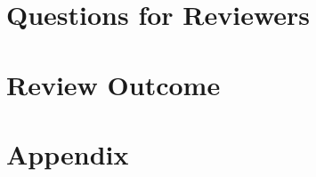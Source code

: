 \documentclass{article}
\begin{document}
\newpage

\section{Questions for Reviewers}

\newpage

\section{Review Outcome}

\newpage

\section{Appendix}





\newpage

\cleardoublepage
{}


\end{document}

